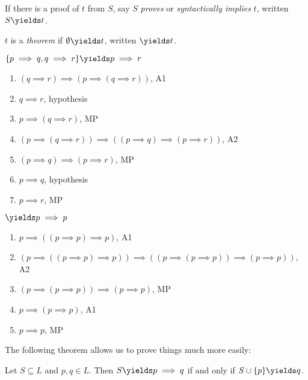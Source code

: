 \documentclass[a4paper]{article}
\begin{document}
\begin{definition}
  If there is a proof of \(t\) from \(S\), say \(S\) \emph{proves} or \emph{syntactically implies} \(t\), written \(S \yields t\).
\end{definition}

\begin{definition}[Theorem]
  \(t\) is a \emph{theorem} if \(\emptyset \yields t\), written \(\yields t\).
\end{definition}

\begin{eg}
  \(\{p \implies q, q \implies r\} \yields p \implies r\)
  \begin{enumerate}
  \item \((q \implies r) \implies (p \implies (q \implies r))\), A1
  \item \(q \implies r\), hypothesis
  \item \(p \implies (q \implies r)\), MP
  \item \((p \implies (q \implies r)) \implies ((p \implies q) \implies (p \implies r))\), A2
  \item \((p \implies q) \implies (p \implies r)\), MP
  \item \(p \implies q\), hypothesis
  \item \(p \implies r\), MP
  \end{enumerate}
\end{eg}

\begin{eg}
  \(\yields p \implies p\)
  \begin{enumerate}
  \item \(p \implies ((p \implies p) \implies p)\), A1
  \item \((p \implies ((p \implies p) \implies p)) \implies ((p \implies (p \implies p)) \implies (p \implies p))\), A2
  \item \((p \implies (p \implies p)) \implies (p \implies p)\), MP
  \item \(p \implies (p \implies p)\), A1
  \item \(p \implies p\), MP
  \end{enumerate}
\end{eg}

The following theorem allows us to prove things much more easily:

\begin{theorem}
  Let \(S \subseteq L\) and \(p, q \in L\). Then \(S \yields p \implies q\) if and only if \(S \cup \{p\} \yields q\).
\end{theorem}
\end{document}
